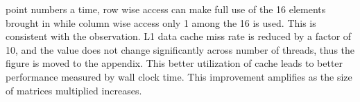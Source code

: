 \documentclass[9pt]{extarticle}
\begin{document}
point numbers a time, row wise access can make full use of the 16 elements brought in while column wise access only 1 among the 16 is
used. This is consistent with the observation. L1 data cache miss rate is reduced by a factor of 10, and the value 
does not change significantly across number of threads, thus the figure is moved to the appendix.
This better utilization of cache leads to better performance measured by wall clock time. This improvement amplifies as the size of matrices
multiplied increases. 
\par\vspace{1ex}
\begin{minipage}{0.45\linewidth}
  \noindent{}
\end{minipage}\hfill
\begin{minipage}{0.5\linewidth}
  \noindent{}
\end{minipage}\hfill
\end{document}
